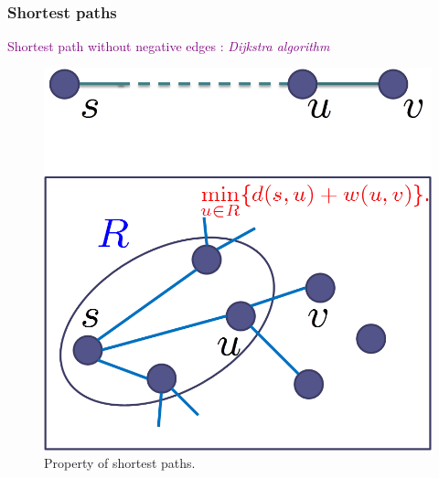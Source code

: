 \begin{frame}
  \frametitle{Shortest paths}

  \textcolor{purple}{Shortest path without negative edges : \emph{Dijkstra algorithm}}

  \begin{figure}
    \begin{center}
      \includegraphics[scale=0.40]{figure/bfs_dfs/dijkstra}
      \caption{{\scriptsize Property of shortest paths.}}
      \label{fig:dijkstra}
    \end{center}
  \end{figure}

\end{frame}


